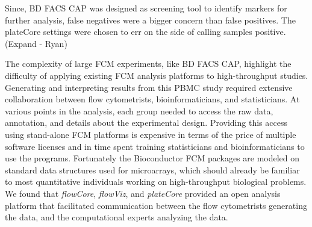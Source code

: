 \documentclass[12pt]{article}
\newcommand{\Rpackage}[1]{{\textit{#1}}}
\begin{document}
Since, BD FACS CAP was designed as screening tool to 
identify markers for further analysis, false negatives were a bigger concern than false positives. The plateCore
settings were chosen to err on the side of calling samples positive. %
(Expand - Ryan)

The complexity of large FCM experiments, like BD FACS CAP, highlight the 
difficulty of applying existing FCM analysis platforms to high-throughput studies. Generating and
interpreting results from this PBMC study required extensive collaboration between flow cytometrists,
bioinformaticians, and statisticians. At various points in the analysis, each group needed to access
the raw data, annotation, and details about the experimental design. Providing this access using
stand-alone FCM platforms is expensive in terms of the price of multiple software licenses
and in time spent training statisticians and bioinformaticians to use the programs. 
Fortunately the Bioconductor FCM packages are modeled on standard data structures used for 
microarrays, which should already be familiar to most quantitative individuals working on 
high-throughput biological problems. We found that \Rpackage{flowCore}, \Rpackage{flowViz},
and \Rpackage{plateCore} provided an open analysis platform that facilitated communication between
the flow cytometrists generating the data, and the computational experts analyzing the data.


\clearpage

 
\end{document}
